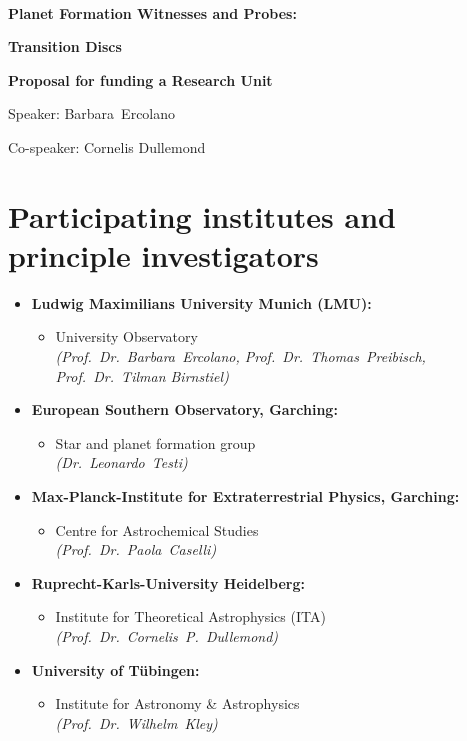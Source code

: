 \documentclass[12pt]{article}
\begin{document}
\mbox{}
\vspace{4cm}\\

\centerline{\huge \bf Planet Formation Witnesses and Probes:}
\vspace{0.5cm}
\centerline{\huge \bf Transition Discs}
\vspace{3cm}
\centerline{\Large \bf Proposal for funding a Research Unit}
\vspace{6cm}
\centerline{\Large Speaker: Barbara~Ercolano}
\vspace{0.5cm}
\centerline{\Large Co-speaker: Cornelis Dullemond}
\vspace{1.5cm}

\pagebreak[4]


\section{Participating institutes and 
principle investigators
}\label{app-institutes}
\begin{itemize}
\item {\bf Ludwig Maximilians University Munich (LMU):}
 \begin{itemize}
  \item University Observatory\\    
         {\em (Prof.~Dr.~Barbara~Ercolano, Prof.~Dr.~Thomas~Preibisch,
           Prof.~Dr.~Tilman Birnstiel)}
  \end{itemize} 
\item {\bf European Southern Observatory, Garching:}
 \begin{itemize} 
\item Star and planet formation group \\
         {\em (Dr.~Leonardo~Testi)}
\end{itemize}
\item {\bf Max-Planck-Institute for Extraterrestrial Physics, Garching:}
 \begin{itemize} 
\item Centre for Astrochemical Studies \\
         {\em (Prof.~Dr.~Paola~Caselli)}
\end{itemize}
\item {\bf Ruprecht-Karls-University Heidelberg:}
\begin{itemize}
 \item Institute for Theoretical Astrophysics (ITA)\\
         {\em (Prof.~Dr.~Cornelis~P.~Dullemond)}
\end{itemize}
\item {\bf University of T\"ubingen:}
\begin{itemize}
  \item Institute for Astronomy \& Astrophysics\\
         {\em (Prof.~Dr.~Wilhelm~Kley)}
\end{itemize}
\end{itemize}
%
\mbox{}\vspace{0.2em}\\
\end{document}
